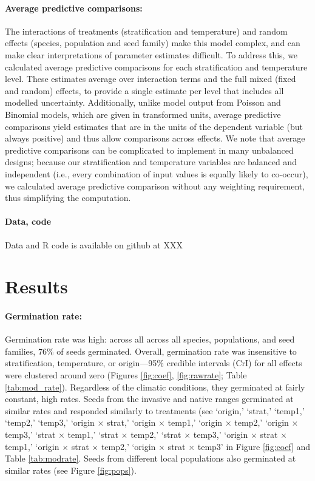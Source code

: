 \documentclass[12pt]{article}\usepackage[]{graphicx}\usepackage[]{color}
\begin{document}
	\paragraph{Average predictive comparisons:} The interactions of treatments (stratification and temperature) and random effects (species, population and seed family) make this model complex, and can make clear interpretations of parameter estimates difficult. To address this, we calculated average predictive comparisons \parencite{Gelman2007} for each stratification and  temperature level. These estimates average over interaction terms and the full mixed (fixed and random) effects, to provide a single estimate per level that includes all modelled uncertainty. Additionally, unlike model output from Poisson and Binomial models, which are given in transformed units, average predictive comparisons yield estimates that are in the units of the dependent variable (but always positive) \parencite{Gelman2007} and thus allow comparisons across effects. We note that average predictive comparisons can be complicated to implement in many unbalanced designs; because our stratification and temperature variables are balanced and independent (i.e., every combination of input values is equally likely to co-occur), we calculated average predictive comparison without any weighting requirement, thus simplifying the computation. 
	
	\paragraph{Data, code} 
	Data and R code is available on github at XXX
	\section{Results} 
	\paragraph{Germination rate:} Germination rate was high: across all across all species, populations, and seed families, 76\% of seeds germinated. Overall, germination rate was insensitive to stratification, temperature, or origin---95\% credible intervals (CrI) for all effects were clustered around zero (Figures \ref{fig:coef}, \ref{fig:rawrate}; Table \ref{tab:mod_rate}). Regardless of the climatic conditions, they germinated at fairly constant, high rates. Seeds from the invasive and native ranges germinated at similar rates and responded similarly to treatments (see `origin,' `strat,' `temp1,' `temp2,' `temp3,' `origin $\times$ strat,' `origin $\times$ temp1,' `origin $\times$ temp2,' `origin $\times$ temp3,' `strat $\times$ temp1,' `strat $\times$ temp2,' `strat $\times$ temp3,' `origin $\times$ strat $\times$ temp1,' `origin $\times$ strat $\times$ temp2,' `origin $\times$ strat $\times$ temp3' in Figure \ref{fig:coef} and Table \ref{tab:modrate}. Seeds from different local populations also germinated at similar rates (see Figure \ref{fig:pops}).
\end{document}
